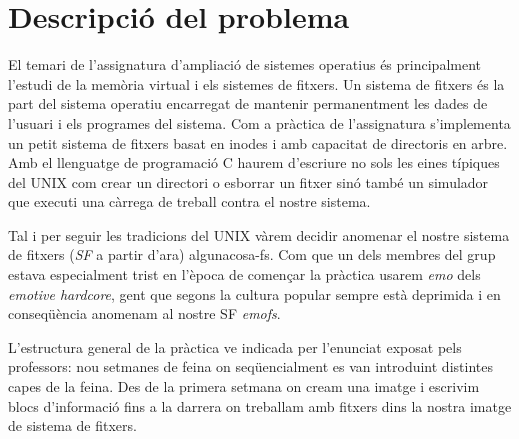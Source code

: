 
\section{Descripció del problema}

El temari de l'assignatura d'ampliació de sistemes operatius és principalment
l'estudi de la memòria virtual i els sistemes de fitxers. Un sistema de fitxers
és la part del sistema operatiu encarregat de mantenir permanentment les dades
de l'usuari i els programes del sistema. Com a pràctica de l'assignatura
s'implementa un petit sistema de fitxers basat en inodes i amb capacitat de
directoris en arbre. Amb el llenguatge de programació C haurem d'escriure no
sols les eines típiques del UNIX com crear un directori o esborrar un fitxer
sinó també un simulador que executi una càrrega de treball contra el nostre
sistema.

Tal i per seguir les tradicions del UNIX vàrem decidir anomenar el nostre
sistema de fitxers (\emph{SF} a partir d'ara) algunacosa-fs. Com que un dels
membres del grup estava especialment trist en l'època de començar la pràctica
usarem \emph{emo} dels \emph{emotive hardcore}, gent que segons la cultura
popular sempre està deprimida i en conseqüència anomenam al nostre SF
\emph{emofs}.

L'estructura general de la pràctica ve indicada per l'enunciat exposat pels
professors: nou setmanes de feina on seqüencialment es van introduint distintes
capes de la feina. Des de la primera setmana on cream una imatge i escrivim
blocs d'informació fins a la darrera on treballam amb fitxers dins la nostra
imatge de sistema de fitxers.
